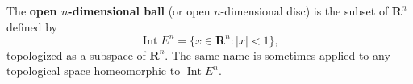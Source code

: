 The \textbf{open $n$-dimensional ball} (or open $n$-dimensional disc) is the subset of $\mathbf{R}^n$ defined by
\[
\operatorname{Int} E^n = \{ x \in \mathbf{R}^n : |x| < 1 \},
\]
topologized as a subspace of $\mathbf{R}^n$. The same name is sometimes applied to any topological space homeomorphic to $\operatorname{Int} E^n$.
